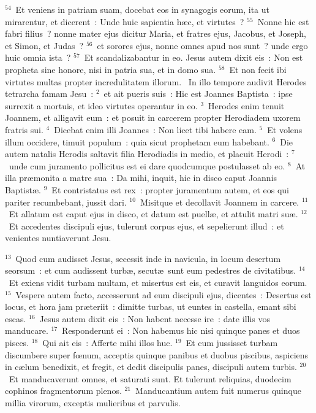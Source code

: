 ${}^{54}$~Et veniens in patriam suam, docebat eos in synagogis eorum, ita ut mirarentur, et dicerent~: Unde huic sapientia h\ae c, et virtutes~?
${}^{55}$~Nonne hic est fabri filius~? nonne mater ejus dicitur Maria, et fratres ejus, Jacobus, et Joseph, et Simon, et Judas~?
${}^{56}$~et sorores ejus, nonne omnes apud nos sunt~? unde ergo huic omnia ista~?
${}^{57}$~Et scandalizabantur in eo. Jesus autem dixit eis~: Non est propheta sine honore, nisi in patria sua, et in domo sua.
${}^{58}$~Et non fecit ibi virtutes multas propter incredulitatem illorum.
~In illo tempore audivit Herodes tetrarcha famam Jesu~:
${}^{2}$~et ait pueris suis~: Hic est Joannes Baptista~: ipse surrexit a mortuis, et ideo virtutes operantur in eo.
${}^{3}$~Herodes enim tenuit Joannem, et alligavit eum~: et posuit in carcerem propter Herodiadem uxorem fratris sui.
${}^{4}$~Dicebat enim illi Joannes~: Non licet tibi habere eam.
${}^{5}$~Et volens illum occidere, timuit populum~: quia sicut prophetam eum habebant.
${}^{6}$~Die autem natalis Herodis saltavit filia Herodiadis in medio, et placuit Herodi~:
${}^{7}$~unde cum juramento pollicitus est ei dare quodcumque postulasset ab eo.
${}^{8}$~At illa pr\ae monita a matre sua~: Da mihi, inquit, hic in disco caput Joannis Baptist\ae .
${}^{9}$~Et contristatus est rex~: propter juramentum autem, et eos qui pariter recumbebant, jussit dari.
${}^{10}$~Misitque et decollavit Joannem in carcere.
${}^{11}$~Et allatum est caput ejus in disco, et datum est puell\ae , et attulit matri su\ae .
${}^{12}$~Et accedentes discipuli ejus, tulerunt corpus ejus, et sepelierunt illud~: et venientes nuntiaverunt Jesu.


${}^{13}$~Quod cum audisset Jesus, secessit inde in navicula, in locum desertum seorsum~: et cum audissent turb\ae , secut\ae\ sunt eum pedestres de civitatibus.
${}^{14}$~Et exiens vidit turbam multam, et misertus est eis, et curavit languidos eorum.
${}^{15}$~Vespere autem facto, accesserunt ad eum discipuli ejus, dicentes~: Desertus est locus, et hora jam pr\ae teriit~: dimitte turbas, ut euntes in castella, emant sibi escas.
${}^{16}$~Jesus autem dixit eis~: Non habent necesse ire~: date illis vos manducare.
${}^{17}$~Responderunt ei~: Non habemus hic nisi quinque panes et duos pisces.
${}^{18}$~Qui ait eis~: Afferte mihi illos huc.
${}^{19}$~Et cum jussisset turbam discumbere super fœnum, acceptis quinque panibus et duobus piscibus, aspiciens in c\ae lum benedixit, et fregit, et dedit discipulis panes, discipuli autem turbis.
${}^{20}$~Et manducaverunt omnes, et saturati sunt. Et tulerunt reliquias, duodecim cophinos fragmentorum plenos.
${}^{21}$~Manducantium autem fuit numerus quinque millia virorum, exceptis mulieribus et parvulis.


